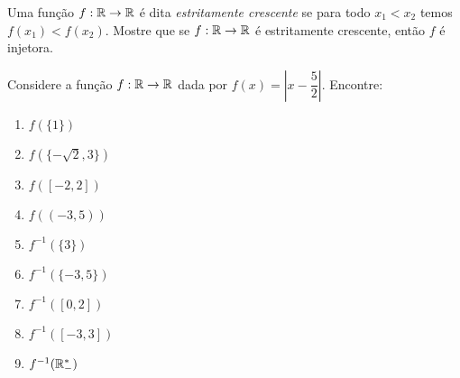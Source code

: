 \documentclass[12pt]{exam}
\begin{document}
    \vspace{.3cm}

    \questao{} Uma função $f : \mathbb{R} \to \mathbb{R}$ é dita \textit{estritamente crescente} se para todo $x_1 < x_2$ temos $f(x_1) < f(x_2)$. Mostre que se $f : \mathbb{R} \to \mathbb{R}$ é estritamente crescente, então $f$ é injetora.

    \vspace{.3cm}

    \questao{} Considere a fun\c{c}\~ao $f : \mathbb{R} \to \mathbb{R}$ dada por $f(x) = \left| x - \dfrac{5}{2}\right|$. Encontre:
    \begin{multicols}{3}
        \begin{enumerate}[label={\alph*})]
            \item $f(\{1\})$

            \item $f(\{-\sqrt{2}, 3\})$

            \item $f([-2,2])$

            \item $f((-3,5))$

            \item $f^{-1}(\{3\})$

            \item $f^{-1}(\{-3,5\})$

            \item $f^{-1}([0,2])$

            \item $f^{-1}([-3,3])$

            \item $f^{-1}(\mathbb{R}^*_-)$
        \end{enumerate}
    \end{multicols}

    \vspace{.3cm}
\end{document}
